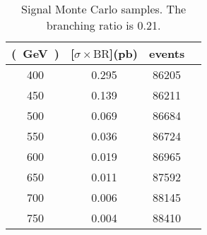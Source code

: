 \begin{table}[phtb]
    \centering
    \begin{tabular}{*4c}
        \toprule
        \unit[mass]{(GeV)} & \unit[$\sigma \times \text{BR}$]{(pb)} & events \\
        \midrule
        400 & 0.295 & 86205 \\
        450 & 0.139 & 86211 \\
        500 & 0.069 & 86684 \\
        550 & 0.036 & 86724 \\
        600 & 0.019 & 86965 \\
        650 & 0.011 & 87592 \\
        700 & 0.006 & 88145 \\
        750 & 0.004 & 88410 \\
        \bottomrule
    \end{tabular}
    \caption{Signal Monte Carlo samples. The branching ratio is 0.21.}
    \label{tab:signal_mc}
\end{table}
